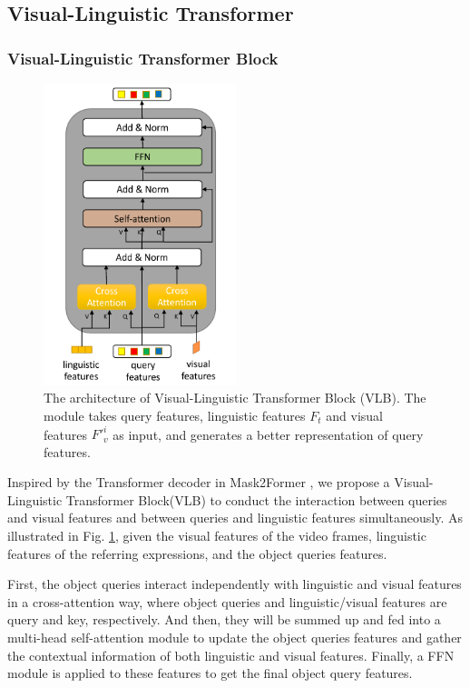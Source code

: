 \subsection{Visual-Linguistic Transformer}
\subsubsection{Visual-Linguistic Transformer Block}

\begin{figure}[ht]
    \centering
    \includegraphics[width=0.5\textwidth]{content/resources/images/referring_segmentation/VLBlock.pdf}
    \caption{The architecture of Visual-Linguistic Transformer Block (VLB). The module takes query features, linguistic features $F_t$ and visual features $F'_v^i$ as input, and generates a better representation of query features.}
    \label{fig:vlb}
\end{figure}

Inspired by the Transformer decoder in Mask2Former \cite{cheng_masked-attention_2022}, we propose a Visual-Linguistic Transformer Block(VLB) to conduct the interaction between queries and visual features and between queries and linguistic features simultaneously. As illustrated in Fig. \ref{fig:vlb}, given the visual features of the video frames, linguistic features of the referring expressions, and the object queries features. 

First, the object queries interact independently with linguistic and visual features in a cross-attention way, where object queries and linguistic/visual features are query and key, respectively. 
And then, they will be summed up and fed into a multi-head self-attention module to update the object queries features and gather the contextual information of both linguistic and visual features. Finally, a FFN module is applied to these features to get the final object query features. 

